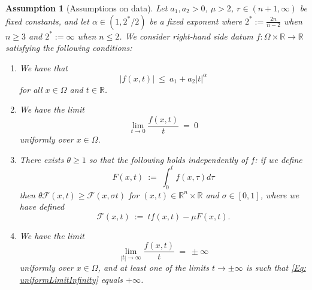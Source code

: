 \documentclass[10pt,a4paper]{amsart}
\newtheorem{assumption}{Assumption}
\def\Om{\Omega}
\def\R{\mathbb{R}}
\def\al{\alpha}
\def\sig{\sigma}
\def\th{\theta}
\begin{document}
\begin{assumption}[Assumptions on data]\label{Assump: AdmissibleControls}
     Let $a_1, a_2 > 0$, $\mu > 2$, $r \in (n + 1, \infty)$ be fixed constants, and let $\al \in (1, 2^*/2)$ be a fixed exponent where $2^* := \frac{2n}{n - 2}$ when $n \geq 3$ and $2^* := \infty$ when $n \leq 2$. 
     We consider right-hand side datum $f: \Om \times \R \rightarrow \R$ satisfying the following conditions:
    \begin{enumerate}[label=\textbf{A\arabic*}]
        \item \label{A2} We have that 
        \begin{equation}\label{Eq: fGrowth}
            |f(x, t)| \ \leq \ a_1 + a_2|t|^{\al}
        \end{equation}
        for all $x \in \Om$ and $t \in \R$.
        \item\label{A3} We have the limit
        \begin{equation}\label{Eq: uniformLimit}
            \lim_{t \rightarrow 0}\frac{f(x, t)}{t} \ = \ 0
        \end{equation}
        uniformly over $x \in \Om$.
        \item\label{A4} There exists $\th \geq 1$ so that the following holds independently of $f$: if we define 
        \begin{equation}\label{Eq: Gantideriv}
            F(x, t) \ := \ \int^{t}_{0}f(x, \tau)d\tau
        \end{equation}
        then $\th\mathcal{F}(x, t) \geq \mathcal{F}(x, \sig t)$ for $(x, t) \in \R^n \times \R$ and $\sig \in [0, 1]$, where we have defined
        \begin{equation}\label{Eq: ScrFDef}
            \mathcal{F}(x, t) \ := \ tf(x, t) - \mu F(x, t).
        \end{equation}
        \item\label{A5} We have the limit
        \begin{equation}\label{Eq: uniformLimitInfinity}
            \lim_{|t| \rightarrow \infty}\frac{f(x, t)}{t} \ = \ \pm \infty
        \end{equation}
        uniformly over $x \in \Om$, and at least one of the limits $t \rightarrow \pm \infty$ is such that \eqref{Eq: uniformLimitInfinity} equals $+\infty$.
    \end{enumerate}
\end{assumption}
\end{document}
